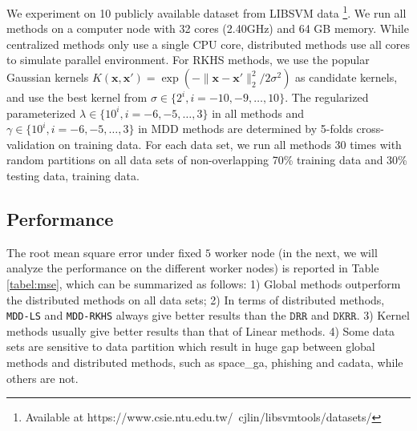 \documentclass{article}
\begin{document}
We experiment on 10 publicly available dataset from LIBSVM data
\footnote{Available at https://www.csie.ntu.edu.tw/~cjlin/libsvmtools/datasets/}.
We run all methods on a computer node with 32 cores (2.40GHz) and 64 GB memory.
While centralized methods only use a single CPU core, distributed methods use all cores to simulate parallel environment.
For RKHS methods, we use the popular Gaussian kernels $K(\mathbf{x}, \mathbf{x}')=\exp(-{\|\mathbf{x}-\mathbf{x}'\|_2^2}/{2\sigma^2})$
as candidate kernels, and use the best kernel from $\sigma \in \{2^i, i=-10, -9, \dots, 10\}$.
The regularized parameterized $\lambda \in \{10^i, i=-6,-5,\dots,3\}$ in all methods and $\gamma \in \{10^i, i=-6,-5,\dots,3\}$
in MDD methods are determined by 5-folds cross-validation on training data.
For each data set,  we run all methods 30 times with random partitions on all data
sets of non-overlapping 70\% training data and 30\% testing data, training data.

\subsection{Performance}
The root mean square error  under fixed $5$ worker node (in the next, we will analyze the performance on the different worker nodes)
is reported in Table \ref{tabel:mse}, which can be summarized as follows:
1) Global methods outperform the distributed methods on all data sets;
2) In terms of distributed methods, \texttt{MDD-LS} and \texttt{MDD-RKHS} always give better results than the $\texttt{DRR}$ and $\texttt{DKRR}$.
3) Kernel methods usually give better results than that of Linear methods.
4) Some data sets are sensitive to data partition which result in huge gap between global methods and distributed methods,
such as space\_ga, phishing and cadata, while others are not.
\end{document}
